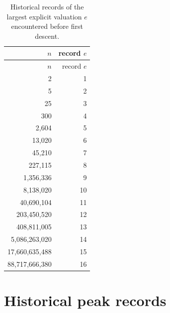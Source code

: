 \documentclass[11pt]{article}
\theoremstyle{definition}
\begin{document}
\begin{longtable}{r r}
\caption{Historical records of the largest explicit valuation $e$ encountered before first descent.}\\
\toprule
$n$ & record $e$\\
\midrule
\endfirsthead
\toprule
$n$ & record $e$\\
\midrule
\endhead
2 & 1 \\
5 & 2 \\
25 & 3 \\
300 & 4 \\
2{,}604 & 5 \\
13{,}020 & 6 \\
45{,}210 & 7 \\
227{,}115 & 8 \\
1{,}356{,}336 & 9 \\
8{,}138{,}020 & 10 \\
40{,}690{,}104 & 11 \\
203{,}450{,}520 & 12 \\
408{,}811{,}005 & 13 \\
5{,}086{,}263{,}020 & 14 \\
17{,}660{,}635{,}488 & 15 \\
88{,}717{,}666{,}380 & 16 \\
\bottomrule
\end{longtable}

\section{Historical peak records}
\end{document}
